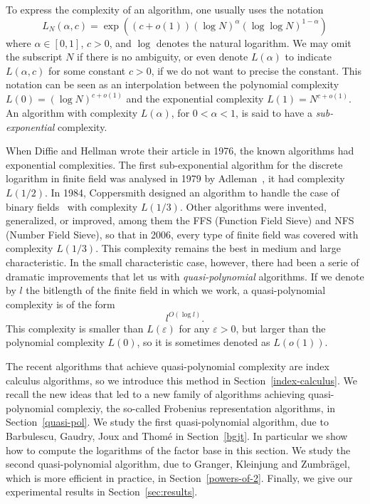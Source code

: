 \documentclass[a4paper,11pt]{article}
\theoremstyle{break}
\theoremstyle{sc}
\theoremstyle{definition}
\theoremstyle{remark}
\begin{document}
To express the complexity of an algorithm, one usually uses the notation
\[
  L_N(\alpha, c) = \exp((c+o(1))(\log N)^\alpha(\log\log N)^{1-\alpha})
\]
where $\alpha\in[0, 1]$, $c>0$, and $\log$ denotes the natural logarithm. We may
omit the subscript $N$ if there is no ambiguity, or even denote
$L(\alpha)$ to indicate $L(\alpha, c)$ for some constant $c>0$, if we do not
want to precise the constant. This notation can be seen as an interpolation
between the polynomial complexity $L(0)=(\log N)^{c+o(1)}$ and the exponential
complexity $L(1)=N^{c+o(1)}$. An algorithm with complexity $L(\alpha)$, for
$0<\alpha<1$, is said to have a \emph{sub-exponential} complexity.

When Diffie and Hellman wrote their article in 1976, the known algorithms
had exponential complexities. The first sub-exponential algorithm for the
discrete logarithm in finite field was analysed
in 1979 by Adleman~\cite{Adleman79}, it had complexity $L(1/2)$. In 1984, 
Coppersmith designed
an algorithm to handle the case of binary fields~\cite{Coppersmith84} with 
complexity $L(1/3)$. Other
algorithms were invented, generalized, or improved, among them the FFS
(Function Field Sieve) and NFS (Number Field Sieve), so that in 2006, every type
of finite field was covered with complexity $L(1/3)$. This complexity remains
the best in medium and large characteristic. In the small
characteristic case, however, there had been a serie of dramatic
improvements that let us with \emph{quasi-polynomial} algorithms. If we denote
by $l$ the bitlength of the finite field in which we work, a quasi-polynomial
complexity is of the form
\[
  l^{O(\log l)}.
\]
This complexity is smaller than $L(\varepsilon)$ for any
$\varepsilon>0$, but larger than the polynomial complexity $L(0)$, so it
is sometimes denoted as $L(o(1))$.

The recent algorithms that achieve quasi-polynomial complexity are index
calculus algorithms, so we introduce this method in
Section~\ref{index-calculus}. We recall the new ideas that led to a new family
of algorithms achieving quasi-polynomial complexiy, the so-called Frobenius representation algorithms, in Section~\ref{quasi-pol}. We study the first quasi-polynomial algorithm, due to
Barbulescu, Gaudry, Joux and Thomé in Section~\ref{bgjt}. In particular we show
how to compute the logarithms of the factor base in this section. We study the
second quasi-polynomial algorithm, due to Granger, Kleinjung and Zumbrägel,
which is more efficient in practice, in Section~\ref{powers-of-2}. Finally, we
give our experimental results in Section~\ref{sec:results}.
\end{document}
